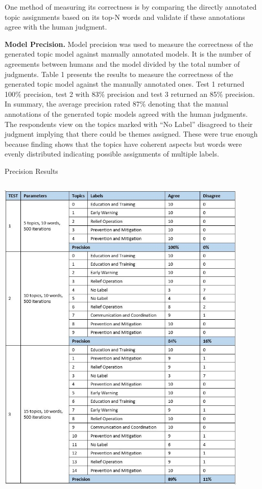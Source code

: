One method of measuring its correctness is by comparing the directly annotated topic assignments based on its top-N words and validate if these annotations agree with the human judgment. 

\textbf{Model Precision.} Model precision was used to measure the correctness of the generated topic model against manually annotated models. It is the number of agreements between humans and the model divided by the total number of judgments. Table 1 presents the results to measure the correctness of the generated topic model against the manually annotated ones. Test 1 returned 100\% precision, test 2 with 83\% precision and test 3 returned an 85\% precision. 
In summary, the average precision rated 87\% denoting that the manual annotations of the generated topic models agreed with the human judgments. The respondents view on the topics marked with “No Label” disagreed to their judgment implying that there could be themes assigned. These were true enough because finding shows that the topics have coherent aspects but words were evenly distributed indicating possible assignments of multiple labels.



\begin{table}[H]
	\centering
	\caption{Precision Results}
	\centering
	\includegraphics[width=12cm,height=16cm]{image/cs_table1.jpg}
\end{table}

